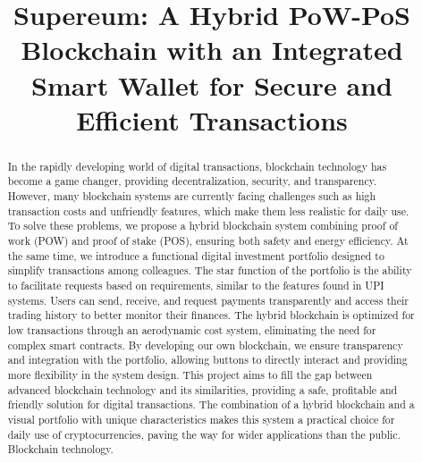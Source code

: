 \documentclass[conference]{IEEEtran}
\begin{document}
\title{Supereum: A Hybrid PoW-PoS Blockchain with an Integrated Smart Wallet for Secure and Efficient Transactions\\

}

\author{
\and
{}
\and
{}

}

\maketitle

\begin{abstract}
In the rapidly developing world of digital transactions, blockchain technology has become a game changer, providing decentralization, security, and transparency. However, many blockchain systems are currently facing challenges such as high transaction costs and unfriendly features, which make them less realistic for daily use. To solve these problems, we propose a hybrid blockchain system combining proof of work (POW) and proof of stake (POS), ensuring both safety and energy efficiency. At the same time, we introduce a functional digital investment portfolio designed to simplify transactions among colleagues.
The star function of the portfolio is the ability to facilitate requests based on requirements, similar to the features found in UPI systems. Users can send, receive, and request payments transparently and access their trading history to better monitor their finances. The hybrid blockchain is optimized for low transactions through an aerodynamic cost system, eliminating the need for complex smart contracts. By developing our own blockchain, we ensure transparency and integration with the portfolio, allowing buttons to directly interact and providing more flexibility in the system design.
This project aims to fill the gap between advanced blockchain technology and its similarities, providing a safe, profitable and friendly solution for digital transactions. The combination of a hybrid blockchain and a visual portfolio with unique characteristics makes this system a practical choice for daily use of cryptocurrencies, paving the way for wider applications than the public. Blockchain technology.

\end{abstract}
\end{document}
